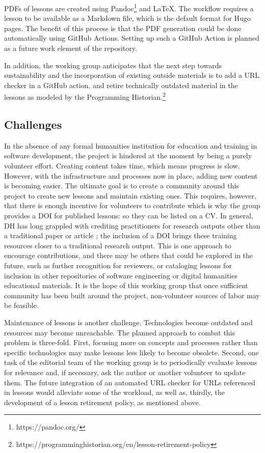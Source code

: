 \documentclass[final]{anthology-ch} %
\begin{document}
PDFs of lessons are created using Pandoc\footnote{https://pandoc.org/
} and LaTeX. The workflow requires a lesson to be available as a Markdown file, which is the default format for Hugo pages. The benefit of this process is that the PDF generation could be done automatically using GitHub Actions. Setting up such a GitHub Action is planned as a future work element of the repository.

In addition, the working group anticipates that the next step towards sustainability and the incorporation of existing outside materials is to add a URL checker in a GitHub action, and retire technically outdated material in the lessons as modeled by the Programming Historian.\footnote{https://programminghistorian.org/en/lesson-retirement-policy
}

\subsection{Challenges}

In the absence of any formal humanities institution for education and training in software development, the project is hindered at the moment by being a purely volunteer effort. Creating content takes time, which means progress is slow. However, with the infrastructure and processes now in place, adding new content is becoming easier. The ultimate goal is to create a community around this project to create new lessons and maintain existing ones. This requires, however, that there is enough incentive for volunteers to contribute which is why the group provides a DOI for published lessons: so they can be listed on a CV. In general, DH has long grappled with crediting practitioners for research outputs other than a traditional paper or article \cite{nowviskie2011}; the inclusion of a DOI brings these training resources closer to a traditional research output. This is one approach to encourage contributions, and there may be others that could be explored in the future, such as further recognition for reviewers, or cataloging lessons for inclusion in other repositories of software engineering or digital humanities educational materials. It is the hope of this working group that once sufficient community has been built around the project, non-volunteer sources of labor may be feasible.

Maintenance of lessons is another challenge. Technologies become outdated and resources may become unreachable. The planned approach to combat this problem is three-fold. First, focusing more on concepts and processes rather than specific technologies may make lessons less likely to become obsolete. Second, one task of the editorial team of the working group is to periodically evaluate lessons for relevance and, if necessary, ask the author or another volunteer to update them. The future integration of an automated URL checker for URLs referenced in lessons would alleviate some of the workload, as well as, thirdly, the development of a lesson retirement policy, as mentioned above.
\end{document}
